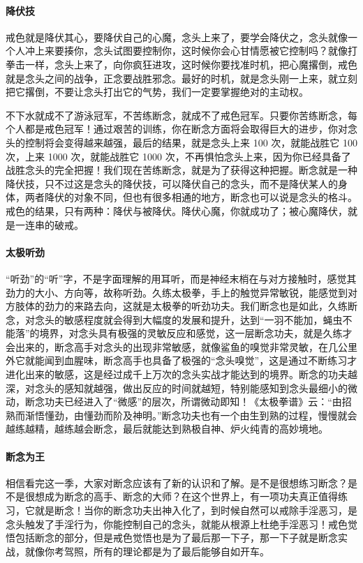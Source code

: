 \paragraph{降伏技}

戒色就是降伏其心，要降伏自己的心魔，念头上来了，要学会降伏之，念头就像一个人冲上来要揍你，念头试图要控制你，这时候你会心甘情愿被它控制吗？就像打拳击一样，念头上来了，向你疯狂进攻，这时候你要找准时机，把心魔撂倒，戒色就是念头之间的战争，正念要战胜邪念。最好的时机，就是念头刚一上来，就立刻把它撂倒，不要让念头打出它的气势，我们一定要掌握绝对的主动权。

不下水就成不了游泳冠军，不苦练断念，就成不了戒色冠军。只要你苦练断念，每个人都是戒色冠军！通过艰苦的训练，你在断念方面将会取得巨大的进步，你对念头的控制将会变得越来越强，最后的结果，就是念头上来 100 次，就能战胜它 100 次，上来 1000 次，就能战胜它 1000 次，不再惧怕念头上来，因为你已经具备了战胜念头的完全把握！我们现在苦练断念，就是为了获得这种把握。断念就是一种降伏技，只不过这是念头的降伏技，可以降伏自己的念头，而不是降伏某人的身体，两者降伏的对象不同，但也有很多相通的地方，断念也可以说是念头的格斗。戒色的结果，只有两种：降伏与被降伏。降伏心魔，你就成功了；被心魔降伏，就是一连串的破戒。

\paragraph{太极听劲}

“听劲”的“听”字，不是字面理解的用耳听，而是神经末梢在与对方接触时，感觉其劲力的大小、方向等，故称听劲。久练太极拳，手上的触觉异常敏锐，能感觉到对方肢体的劲力的来路去向，这就是太极拳的听劲功夫。我们断念也是如此，久练断念，对念头的敏感程度就会得到大幅度的发展和提升，达到“一羽不能加，蝇虫不能落”的境界，对念头具有极强的灵敏反应和感觉，这一层断念功夫，就是久练才会出来的，断念高手对念头的出现非常敏感，就像鲨鱼的嗅觉非常灵敏，在几公里外它就能闻到血腥味，断念高手也具备了极强的“念头嗅觉”，这是通过不断练习才进化出来的敏感，这是经过成千上万次的念头实战才能达到的境界。断念的功夫越深，对念头的感知就越强，做出反应的时间就越短，特别能感知到念头最细小的微动，断念功夫已经进入了“微感”的层次，所谓微动即知！《太极拳谱》云：“由招熟而渐悟懂劲，由懂劲而阶及神明。”断念功夫也有一个由生到熟的过程，慢慢就会越练越精，越练越会断念，最后就能达到熟极自神、炉火纯青的高妙境地。

\paragraph{断念为王}

相信看完这一季，大家对断念应该有了新的认识和了解。是不是很想练习断念？是不是很想成为断念的高手、断念的大师？在这个世界上，有一项功夫真正值得练习，它就是断念！当你的断念功夫出神入化了，到时候自然可以戒除手淫恶习，是念头触发了手淫行为，你能控制自己的念头，就能从根源上杜绝手淫恶习！戒色觉悟包括断念的部分，但是戒色觉悟也是为了最后那一下子，那一下子就是断念实战，就像你考驾照，所有的理论都是为了最后能够自如开车。

